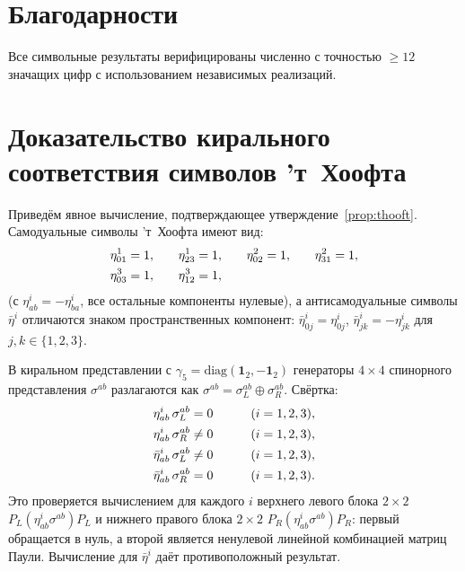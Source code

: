 \documentclass[12pt,a4paper]{article}
\theoremstyle{definition}
\theoremstyle{remark}
\begin{document}
\section*{Благодарности}

Все символьные результаты верифицированы
численно с точностью $\geq 12$ значащих цифр с использованием независимых
реализаций.


\appendix

\section{Доказательство кирального соответствия символов 'т~Хоофта}
\label{app:thooft}

Приведём явное вычисление, подтверждающее
утверждение~\ref{prop:thooft}.  Самодуальные символы 'т~Хоофта имеют вид:
\begin{alignat}{4}
  &\eta^1_{01} = 1, &\quad &\eta^1_{23} = 1, &\quad
  &\eta^2_{02} = 1, &\quad &\eta^2_{31} = 1, \notag\\
  &\eta^3_{03} = 1, &\quad &\eta^3_{12} = 1, &&&&
  \label{eq:eta-explicit}
\end{alignat}
(с $\eta^i_{ab} = -\eta^i_{ba}$, все остальные компоненты нулевые), а
антисамодуальные символы $\bar\eta^i$ отличаются знаком пространственных
компонент: $\bar\eta^i_{0j} = \eta^i_{0j}$,
$\bar\eta^i_{jk} = -\eta^i_{jk}$ для $j, k \in \{1,2,3\}$.

В киральном представлении с
$\gamma_5 = \mathrm{diag}(\mathbf{1}_2, -\mathbf{1}_2)$ генераторы
$4 \times 4$ спинорного представления $\sigma^{ab}$ разлагаются как
$\sigma^{ab} = \sigma^{ab}_L \oplus \sigma^{ab}_R$.
Свёртка:
\begin{alignat}{2}
  \eta^i_{ab}\,\sigma^{ab}_L &= 0 &\qquad &(i = 1,2,3), \notag\\
  \eta^i_{ab}\,\sigma^{ab}_R &\neq 0 &\qquad &(i = 1,2,3), \notag\\
  \bar\eta^i_{ab}\,\sigma^{ab}_L &\neq 0 &\qquad &(i = 1,2,3), \notag\\
  \bar\eta^i_{ab}\,\sigma^{ab}_R &= 0 &\qquad &(i = 1,2,3).
\end{alignat}
Это проверяется вычислением для каждого $i$ верхнего левого блока
$2 \times 2$ $P_L (\eta^i_{ab}\sigma^{ab}) P_L$ и нижнего правого блока
$2 \times 2$ $P_R (\eta^i_{ab}\sigma^{ab}) P_R$: первый обращается в
нуль, а второй является ненулевой линейной комбинацией матриц Паули.
Вычисление для $\bar\eta^i$ даёт противоположный результат.
\end{document}
